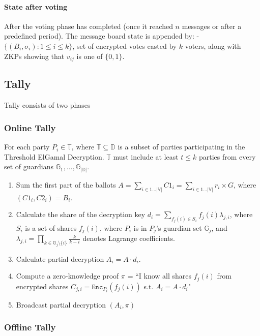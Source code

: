 \documentclass{article}
\begin{document}
\paragraph{State after voting}

After the voting phase has completed (once it reached $n$ messages or after a predefined period). The message board state is appended by:
- $\{(B_{i}, \sigma_i) : 1 \leq i \leq k\}$, set of encrypted votes casted by $k$ voters, along with ZKPs showing that $v_{ij}$ is one of $\{0,1\}$.

\subsection{Tally}

Tally consists of two phases
\subsubsection{Online Tally}

For each party $P_i \in \mathbb{T}$, where $\mathbb{T} \subseteq  \mathbb{D}$ is a subset of parties participating in the Threshold ElGamal Decryption. $\mathbb{T}$ must include at least $t \leq k$ parties from every set of guardians $\mathbb{G}_1,\dots,\mathbb{G}_{|\mathbb{D}|}$.
\begin{enumerate}
    \item Sum the first part of the ballots $A = \sum_{i \in 1 \dots |\mathbb{V}|} C1_i = \sum_{i \in 1 \dots |\mathbb{V}|} r_{i} \times G$, where $(C1_i,C2_i)=B_i$.
    \item  Calculate the share of the decryption key $d_i=\sum_{f_j(i) \in S_i} f_j(i) \lambda_{j,i}$, where $S_i$ is a set of shares $f_j(i)$, where $P_i$ is in $P_j$'s guardian set $\mathbb{G}_j$, and $\lambda_{j,i}=\prod_{k \in \mathbb{G}_j \setminus \{i\}} \frac{k}{k-i}$ denotes Lagrange coefficients. 
    \item Calculate partial decryption $A_i = A \cdot d_i$.
    \item Compute a zero-knowledge proof $\pi$ = “I know all shares $f_j(i)$ from encrypted shares $C_{j,i}=\texttt{Enc}_{P_i}(f_j(i))$ s.t. $A_i = A \cdot d_i$"
    \item Broadcast partial decryption $(A_i, \pi)$
\end{enumerate}

\subsubsection{Offline Tally}
\end{document}
